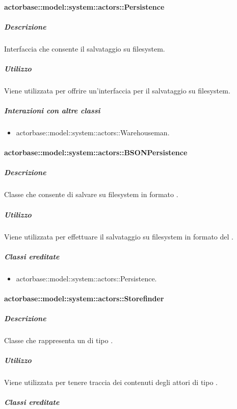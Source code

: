 \documentclass{scalatekids-article}
\begin{document}
\paragraph{actorbase::model::system::actors::Persistence}

\subparagraph{Descrizione}

Interfaccia che consente il salvataggio su filesystem.

\subparagraph{Utilizzo}

Viene utilizzata per offrire un'interfaccia per il salvataggio su filesystem.

\subparagraph{Interazioni con altre classi}

\begin{itemize}
\item actorbase::model::system::actors::Warehouseman.
\end{itemize}

\paragraph{actorbase::model::system::actors::BSONPersistence}

\subparagraph{Descrizione}

Classe che consente di salvare su filesystem in formato .

\subparagraph{Utilizzo}

Viene utilizzata per effettuare il salvataggio su filesystem in formato  del .

\subparagraph{Classi ereditate}

\begin{itemize}
\item actorbase::model::system::actors::Persistence.
\end{itemize}

\paragraph{actorbase::model::system::actors::Storefinder}

\subparagraph{Descrizione}

Classe che rappresenta un  di tipo .

\subparagraph{Utilizzo}

Viene utilizzata per tenere traccia dei contenuti degli attori di tipo .

\subparagraph{Classi ereditate}
\end{document}
